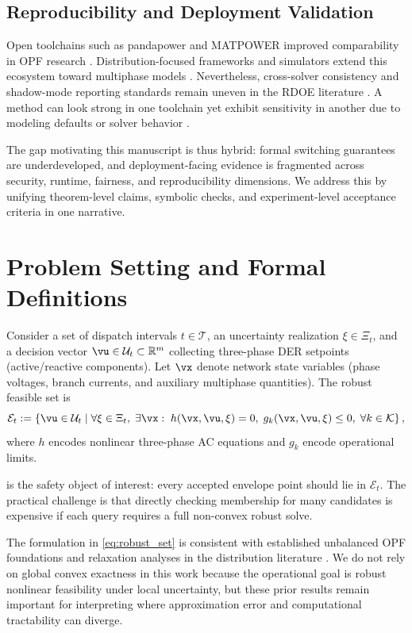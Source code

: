 \documentclass{article} %
\begin{document}
\subsection{Reproducibility and Deployment Validation}
Open toolchains such as pandapower and MATPOWER improved comparability in OPF research \citep{KA32,KA33,KA36,KA39}. Distribution-focused frameworks and simulators extend this ecosystem toward multiphase models \citep{KA38,KA40,KA41}. Nevertheless, cross-solver consistency and shadow-mode reporting standards remain uneven in the RDOE literature \citep{KA35}. A method can look strong in one toolchain yet exhibit sensitivity in another due to modeling defaults or solver behavior \citep{KA05}.

The gap motivating this manuscript is thus hybrid: formal switching guarantees are underdeveloped, and deployment-facing evidence is fragmented across security, runtime, fairness, and reproducibility dimensions. We address this by unifying theorem-level claims, symbolic checks, and experiment-level acceptance criteria in one narrative.

\section{Problem Setting and Formal Definitions}
Consider a set of dispatch intervals $t \in \mathcal{T}$, an uncertainty realization $\xi \in \Xi_t$, and a decision vector $\vu \in \mathcal{U}_t \subset \mathbb{R}^m$ collecting three-phase DER setpoints (active/reactive components). Let $\vx$ denote network state variables (phase voltages, branch currents, and auxiliary multiphase quantities). The robust feasible set is
\begin{equation}
\mathcal{E}_t := \left\{\vu \in \mathcal{U}_t \;\middle|\; \forall \xi \in \Xi_t,\; \exists \vx:\; h(\vx,\vu,\xi)=0,\; g_k(\vx,\vu,\xi) \le 0,\; \forall k \in \mathcal{K} \right\},
\label{eq:robust_set}
\end{equation}
where $h$ encodes nonlinear three-phase AC equations and $g_k$ encode operational limits.

 is the safety object of interest: every accepted envelope point should lie in $\mathcal{E}_t$. The practical challenge is that directly checking membership for many candidates is expensive if each query requires a full non-convex robust solve.

The formulation in \eqref{eq:robust_set} is consistent with established unbalanced OPF foundations and relaxation analyses in the distribution literature \citep{KA18,KA19,KA20,KA25,KA26,KA27,KA28,KA29,KA30,KA31,KA34}. We do not rely on global convex exactness in this work because the operational goal is robust nonlinear feasibility under local uncertainty, but these prior results remain important for interpreting where approximation error and computational tractability can diverge.
\end{document}
